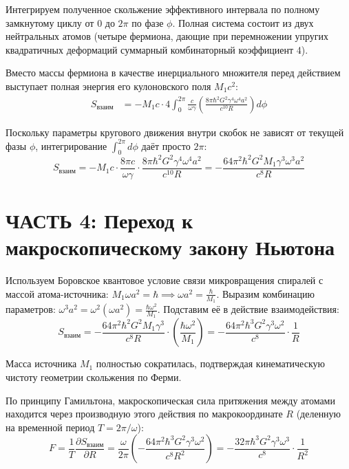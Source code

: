\documentclass[12pt,a4paper]{article}
\begin{document}
Интегрируем полученное скольжение эффективного интервала по полному замкнутому циклу от $0$ до $2\pi$ по фазе $\phi$. Полная система состоит из двух нейтральных атомов (четыре фермиона, дающие при перемножении упругих квадратичных деформаций суммарный комбинаторный коэффициент 4).

Вместо массы фермиона в качестве инерциального множителя перед действием выступает полная энергия его кулоновского поля $M_1 c^2$:
\begin{align}
S_{взаим} &= - M_1 c \cdot 4 \int_0^{2\pi} \frac{c}{\omega \gamma} \left( \frac{8\pi \hbar^2 G^2 \gamma^4 \omega^4 a^2}{c^{10} R} \right) d\phi
\end{align}

Поскольку параметры кругового движения внутри скобок не зависят от текущей фазы $\phi$, интегрирование $\int_0^{2\pi} d\phi$ даёт просто $2\pi$:
\begin{equation}
S_{взаим} = - M_1 c \cdot \frac{8\pi c}{\omega \gamma} \cdot \frac{8\pi \hbar^2 G^2 \gamma^4 \omega^4 a^2}{c^{10} R} = - \frac{64 \pi^2 \hbar^2 G^2 M_1 \gamma^3 \omega^3 a^2}{c^8 R}
\end{equation}

\section*{ЧАСТЬ 4: Переход к макроскопическому закону Ньютона}

Используем Боровское квантовое условие связи микровращения спиралей с массой атома-источника: $M_1 \omega a^2 = \hbar \implies \omega a^2 = \frac{\hbar}{M_1}$. Выразим комбинацию параметров: $\omega^3 a^2 = \omega^2 (\omega a^2) = \frac{\hbar \omega^2}{M_1}$. Подставим её в действие взаимодействия:
\begin{equation}
S_{взаим} = - \frac{64 \pi^2 \hbar^2 G^2 M_1 \gamma^3}{c^8 R} \cdot \left( \frac{\hbar \omega^2}{M_1} \right) = - \frac{64 \pi^2 \hbar^3 G^2 \gamma^3 \omega^2}{c^8} \cdot \frac{1}{R}
\end{equation}

Масса источника $M_1$ полностью сократилась, подтверждая кинематическую чистоту геометрии скольжения по Ферми.

По принципу Гамильтона, макроскопическая сила притяжения между атомами находится через производную этого действия по макрокоординате $R$ (деленную на временной период $T = 2\pi/\omega$):
\begin{equation}
F = \frac{1}{T} \frac{\partial S_{взаим}}{\partial R} = \frac{\omega}{2\pi} \left( - \frac{64 \pi^2 \hbar^3 G^2 \gamma^3 \omega^2}{c^8 R^2} \right) = - \frac{32\pi \hbar^3 G^2 \gamma^3 \omega^3}{c^8} \cdot \frac{1}{R^2}
\end{equation}
\end{document}
